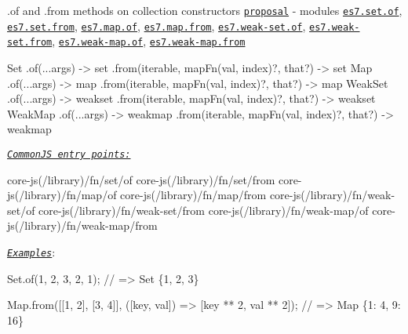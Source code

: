 \begin{DoxyItemize}
\item {\ttfamily .of} and {\ttfamily .from} methods on collection constructors \href{https://github.com/tc39/proposal-setmap-offrom}{\tt proposal} -\/ modules \href{https://github.com/zloirock/core-js/blob/v2.6.0/modules/es7.set.of.js}{\tt {\ttfamily es7.\+set.\+of}}, \href{https://github.com/zloirock/core-js/blob/v2.6.0/modules/es7.set.from.js}{\tt {\ttfamily es7.\+set.\+from}}, \href{https://github.com/zloirock/core-js/blob/v2.6.0/modules/es7.map.of.js}{\tt {\ttfamily es7.\+map.\+of}}, \href{https://github.com/zloirock/core-js/blob/v2.6.0/modules/es7.map.from.js}{\tt {\ttfamily es7.\+map.\+from}}, \href{https://github.com/zloirock/core-js/blob/v2.6.0/modules/es7.weak-set.of.js}{\tt {\ttfamily es7.\+weak-\/set.\+of}}, \href{https://github.com/zloirock/core-js/blob/v2.6.0/modules/es7.weak-set.from.js}{\tt {\ttfamily es7.\+weak-\/set.\+from}}, \href{https://github.com/zloirock/core-js/blob/v2.6.0/modules/es7.weak-map.of.js}{\tt {\ttfamily es7.\+weak-\/map.\+of}}, \href{https://github.com/zloirock/core-js/blob/v2.6.0/modules/es7.weak-map.from.js}{\tt {\ttfamily es7.\+weak-\/map.\+from}} 
\begin{DoxyCode}
Set
  .of(...args) -> set
  .from(iterable, mapFn(val, index)?, that?) -> set
Map
  .of(...args) -> map
  .from(iterable, mapFn(val, index)?, that?) -> map
WeakSet
  .of(...args) -> weakset
  .from(iterable, mapFn(val, index)?, that?) -> weakset
WeakMap
  .of(...args) -> weakmap
  .from(iterable, mapFn(val, index)?, that?) -> weakmap
\end{DoxyCode}
 \href{#commonjs}{\tt {\itshape Common\+JS entry points\+:}} 
\begin{DoxyCode}
core-js(/library)/fn/set/of
core-js(/library)/fn/set/from
core-js(/library)/fn/map/of
core-js(/library)/fn/map/from
core-js(/library)/fn/weak-set/of
core-js(/library)/fn/weak-set/from
core-js(/library)/fn/weak-map/of
core-js(/library)/fn/weak-map/from
\end{DoxyCode}
 \href{https://goo.gl/mSC7eU}{\tt {\itshape Examples}}\+: 
\begin{DoxyCode}
Set.of(1, 2, 3, 2, 1); // => Set \{1, 2, 3\}

Map.from([[1, 2], [3, 4]], ([key, val]) => [key ** 2, val ** 2]); // => Map \{1: 4, 9: 16\}
\end{DoxyCode}


\end{DoxyItemize}
